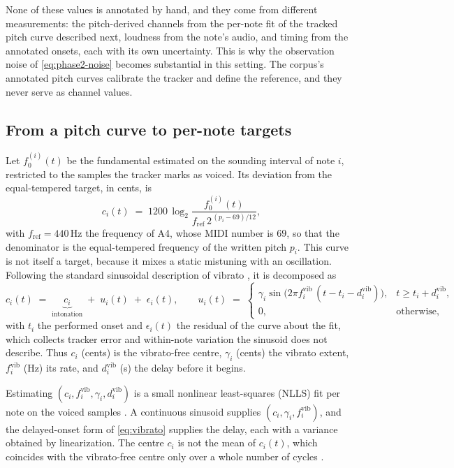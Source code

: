 \documentclass[11pt,a4paper]{report}
\begin{document}
None of these values is annotated by hand, and they come from different
measurements: the pitch-derived channels from the per-note fit of the
tracked pitch curve described next, loudness from the note's audio, and
timing from the annotated onsets, each with its own uncertainty. This is
why the observation noise of \eqref{eq:phase2-noise} becomes substantial in
this setting. The corpus's annotated pitch curves calibrate the tracker and
define the reference, and they never serve as channel values.

\subsection{From a pitch curve to per-note targets}
Let $f_0^{(i)}(t)$ be the fundamental estimated on the sounding interval
of note $i$, restricted to the samples the tracker marks as voiced. Its
deviation from the equal-tempered target, in cents, is
\begin{equation}
  c_i(t) \;=\; 1200\,\log_2 \frac{f_0^{(i)}(t)}{f_{\mathrm{ref}}\, 2^{\,(p_i - 69)/12}} ,
  \label{eq:cents-curve}
\end{equation}
with $f_{\mathrm{ref}} = 440$\,Hz the frequency of A4, whose MIDI number
is $69$, so that the denominator is the equal-tempered frequency of the
written pitch $p_i$. This curve is not itself a target, because it mixes
a static mistuning with an oscillation. Following the standard sinusoidal
description of vibrato \cite{seashore1936,prame1994,prame1997}, it is
decomposed as
\begin{equation}
  c_i(t) \;=\; \underbrace{c_i}_{\text{intonation}} \;+\; u_i(t) \;+\; \epsilon_i(t),
  \qquad
  u_i(t) \;=\;
  \begin{cases}
    \gamma_i \sin\!\bigl(2\pi f_i^{\mathrm{vib}}\,(t - t_i - d_i^{\mathrm{vib}})\bigr), & t \ge t_i + d_i^{\mathrm{vib}},\\[2pt]
    0, & \text{otherwise},
  \end{cases}
  \label{eq:vibrato}
\end{equation}
with $t_i$ the performed onset and $\epsilon_i(t)$ the residual of the curve
about the fit, which collects tracker error and within-note variation the
sinusoid does not describe. Thus $c_i$ (cents) is the vibrato-free
centre, $\gamma_i$ (cents) the vibrato extent, $f_i^{\mathrm{vib}}$ (Hz)
its rate, and $d_i^{\mathrm{vib}}$ (s) the delay before it begins.

Estimating $(c_i, f_i^{\mathrm{vib}}, \gamma_i, d_i^{\mathrm{vib}})$ is a
small nonlinear least-squares (NLLS) fit per note on the voiced samples
\cite{driedger2016}. A continuous sinusoid supplies
$(c_i, \gamma_i, f_i^{\mathrm{vib}})$, and the delayed-onset form of
\eqref{eq:vibrato} supplies the delay, each with a variance obtained by
linearization. The centre $c_i$ is not the mean of $c_i(t)$, which
coincides with the vibrato-free centre only over a whole number of cycles
\cite{dalessandro1994}.
\end{document}

